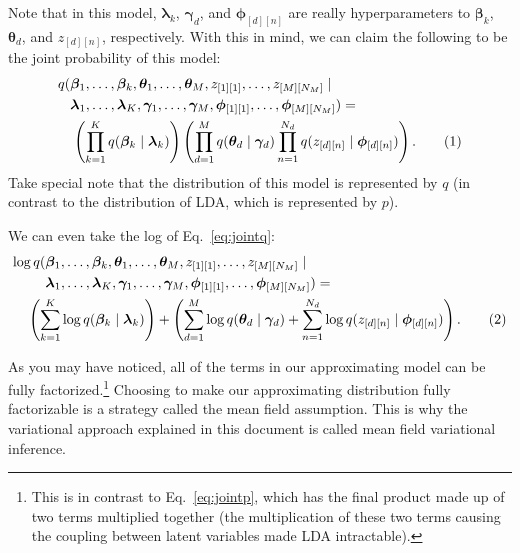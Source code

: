 \documentclass[12pt]{article}
\newcommand\numberthis{\addtocounter{equation}{1}\tag{\theequation}}
\begin{document}
Note that in this model, $\bm{\lambda}_{k}$, $\bm{\gamma}_{d}$, and
$\bm{\phi}_{[d][n]}$ are really hyperparameters to $\bm{\beta}_{k}$,
$\bm{\theta}_{d}$, and $z_{[d][n]}$, respectively.  With this in mind, we can
claim the following to be the joint probability of this model:
\begin{align*}
    &\begin{aligned}q(&\bm{\beta}_{1}, \ldots, \bm{\beta}_{k}, \bm{\theta}_{1}, \ldots,
    \bm{\theta}_{M}, z_{[1][1]}, \ldots, z_{[M][N_{M}]} \mid \\*
    &\bm{\lambda}_{1},
    \ldots, \bm{\lambda}_{K}, \bm{\gamma}_{1}, \ldots, \bm{\gamma}_{M},
    \bm{\phi}_{[1][1]}, \ldots, \bm{\phi}_{[M][N_{M}]}) =
    \end{aligned}\\*
    &\quad\left(\prod_{k=1}^{K}q(\bm{\beta}_{k} \mid \bm{\lambda}_{k})\right)
    \left(\prod_{d=1}^{M}q(\bm{\theta}_{d} \mid \bm{\gamma}_{d})
    \prod_{n=1}^{N_{d}}q(z_{[d][n]} \mid \bm{\phi}_{[d][n]})\right).
    \numberthis\label{eq:jointq}
\end{align*}
Take special note that the distribution of this model is represented by $q$ (in
contrast to the distribution of LDA, which is represented by $p$).

We can even take the log of Eq.~\ref{eq:jointq}:
\begin{align*}
    &\begin{aligned}\log q(&\bm{\beta}_{1}, \ldots, \bm{\beta}_{k}, \bm{\theta}_{1}, \ldots,
    \bm{\theta}_{M}, z_{[1][1]}, \ldots, z_{[M][N_{M}]} \mid \\*
    &\bm{\lambda}_{1},
    \ldots, \bm{\lambda}_{K}, \bm{\gamma}_{1}, \ldots, \bm{\gamma}_{M},
    \bm{\phi}_{[1][1]}, \ldots, \bm{\phi}_{[M][N_{M}]}) =
    \end{aligned}\\*
    &\quad\left(\sum_{k=1}^{K}\log{q(\bm{\beta}_{k} \mid \bm{\lambda}_{k})}\right)
    + \left(\sum_{d=1}^{M}\log{q(\bm{\theta}_{d} \mid \bm{\gamma}_{d})}
    + \sum_{n=1}^{N_{d}}\log{q(z_{[d][n]} \mid \bm{\phi}_{[d][n]})}\right).
    \numberthis\label{eq:logjointq}
\end{align*}

As you may have noticed, all of the terms in our approximating model can be
fully factorized.\footnote{This is in contrast to Eq.~\ref{eq:jointp}, which has
the final product made up of two terms multiplied together (the multiplication
of these two terms causing the coupling between latent variables made LDA
intractable).}  Choosing to make our approximating distribution fully
factorizable is a strategy called the mean field assumption.  This is why the
variational approach explained in this document is called mean field variational
inference.
\end{document}
